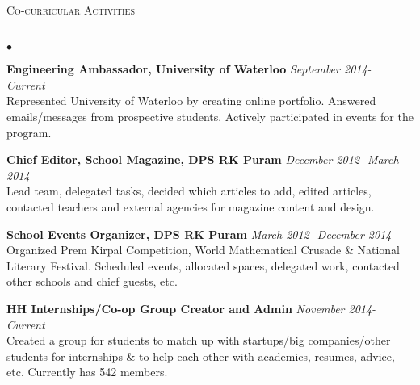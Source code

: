 \documentclass{article}
\newcommand{\lineunder}{\vspace*{-8pt} \\ \hspace*{-18pt} \hrulefill \\}
\newcommand{\header}[1]{{\hspace*{-15pt}\vspace*{6pt} \textsc{#1}} \vspace*{-6pt} \lineunder}
\newenvironment{achievements}{\begin{list}{$\bullet$}{\topsep 0pt \itemsep -1.5pt \leftmargin 5pt}}{\vspace*{4pt}\end{list}}
\begin{document}
\vspace{7pt}

\header{\normalsize Co-curricular Activities}
\begin{achievements}
\item \textbf{Engineering Ambassador, University of Waterloo} \hfill \textit {September 2014- Current}
\\ Represented University of Waterloo by creating online portfolio. Answered emails/messages from prospective students. Actively participated in events for the program.
\item \textbf{Chief Editor, School Magazine, DPS RK Puram} \hfill \textit {December 2012- March 2014}
\\ Lead team, delegated tasks, decided which articles to add, edited articles, contacted teachers and external agencies for magazine content and design.
\item \textbf{School Events Organizer, DPS RK Puram}  \hfill \textit {March 2012- December 2014}
\\ Organized Prem Kirpal Competition, World Mathematical Crusade \& National Literary Festival. Scheduled events, allocated spaces, delegated work, contacted other schools and chief guests, etc.
\item \textbf{HH Internships/Co-op Group Creator and Admin} \hfill \textit {November 2014- Current}
\\ Created a group for students to match up with startups/big companies/other students for internships \& to help each other with academics, resumes, advice, etc. Currently has 542 members.
\end{achievements}

\vspace{7pt}
\end{document}
